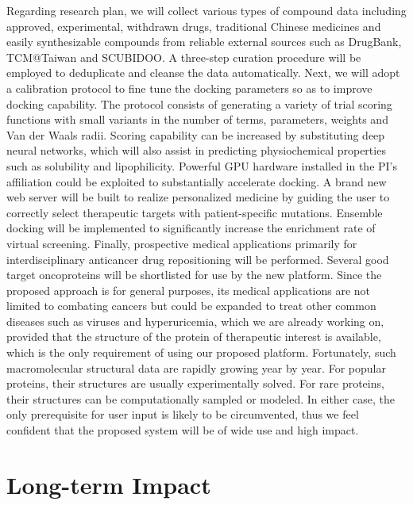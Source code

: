 \documentclass[a4paper,12pt]{article}
\begin{document}
Regarding research plan, we will collect various types of compound data including approved, experimental, withdrawn drugs, traditional Chinese medicines and easily synthesizable compounds from reliable external sources such as DrugBank, TCM@Taiwan and SCUBIDOO. A three-step curation procedure will be employed to deduplicate and cleanse the data automatically. Next, we will adopt a calibration protocol to fine tune the docking parameters so as to improve docking capability. The protocol consists of generating a variety of trial scoring functions with small variants in the number of terms, parameters, weights and Van der Waals radii. Scoring capability can be increased by substituting deep neural networks, which will also assist in predicting physiochemical properties such as solubility and lipophilicity. Powerful GPU hardware installed in the PI's affiliation could be exploited to substantially accelerate docking. A brand new web server will be built to realize personalized medicine by guiding the user to correctly select therapeutic targets with patient-specific mutations. Ensemble docking will be implemented to significantly increase the enrichment rate of virtual screening. Finally, prospective medical applications primarily for interdisciplinary anticancer drug repositioning will be performed. Several good target oncoproteins will be shortlisted for use by the new platform. Since the proposed approach is for general purposes, its medical applications are not limited to combating cancers but could be expanded to treat other common diseases such as viruses and hyperuricemia, which we are already working on, provided that the structure of the protein of therapeutic interest is available, which is the only requirement of using our proposed platform. Fortunately, such macromolecular structural data are rapidly growing year by year. For popular proteins, their structures are usually experimentally solved. For rare proteins, their structures can be computationally sampled or modeled. In either case, the only prerequisite for user input is likely to be circumvented, thus we feel confident that the proposed system will be of wide use and high impact.

\newpage %
\section*{Long-term Impact}
\end{document}
